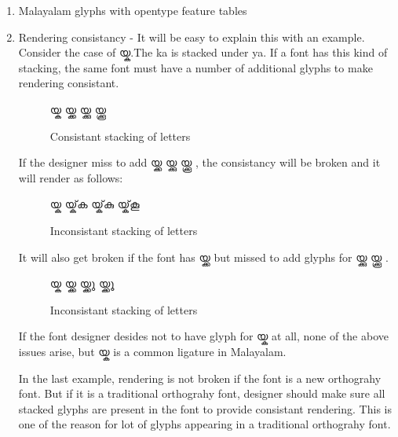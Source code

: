 \begin{enumerate}
\item Malayalam glyphs with opentype feature tables
\item Rendering consistancy - It will be easy to explain this with an example. 
Consider the case of {\malayalam യ്ക}.The ka is stacked under ya. If a font has
this kind of stacking, the same font must have a number of additional glyphs to 
make rendering consistant.
\begin{figure}[h!]
  \centering
  {\meera\textexample യ്ക യ്ക്ക യ്ക്കു യ്ക്കൂ }\\
  \caption{Consistant stacking of letters}
\end{figure}

If the designer miss to add {\meera യ്ക്ക യ്ക്കു യ്ക്കൂ }, the consistancy will 
be broken and it will render as follows:
\begin{figure}[h]
  \centering
  {\meera\textexample യ്ക യ്ക്‌ക യ്ക്‌കു യ്ക്‌കൂ }\\
  \caption{Inconsistant stacking of letters}
\end{figure}

It will also get broken if the font has  {\meera യ്ക്ക} but missed to add 
glyphs for {\meera യ്ക്കു യ്ക്കൂ }.

\begin{figure}[h]
  \centering
  {\meera\textexample യ്ക യ്ക്ക യ്ക്ക‌ു യ്ക്ക‌ൂ }\\
  \caption{Inconsistant stacking of letters}
\end{figure}

If the font designer desides not to have glyph for {\meera യ്ക } at  all, none 
of the above issues arise, but  {\meera യ്ക } is a common ligature in Malayalam.

In the last example, rendering is not broken if the font is a new orthograhy 
font. But if it is a traditional orthograhy font, designer should make sure all 
stacked glyphs are present in the font to provide consistant rendering. This is 
one of the reason for lot of glyphs appearing in a traditional orthograhy font.
\end{enumerate}

